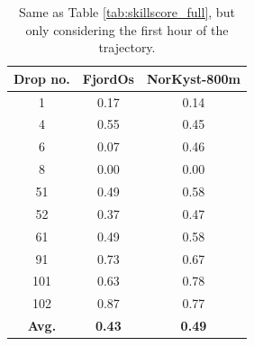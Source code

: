 \begin{table}
\begin{center}
  \begin{tabular}{ | c | c | c |}
    \hline
    {\bf Drop no.} & {\bf FjordOs} & {\bf NorKyst-800m} \\ \hline
    1 & 0.17 & 0.14 \\ 
    4 & 0.55 & 0.45 \\
    6 & 0.07 & 0.46 \\
    8 & 0.00 & 0.00 \\
    51 & 0.49 & 0.58 \\
    52 & 0.37 & 0.47 \\
    61 & 0.49 & 0.58 \\
    91 & 0.73 & 0.67 \\
    101 & 0.63 & 0.78 \\
    102 & 0.87 & 0.77 \\ \hline
    {\bf Avg.} & {\bf 0.43} & {\bf 0.49} \\
    \hline
  \end{tabular}
\caption{Same as Table \ref{tab:skillscore_full}, but only considering the first hour of the trajectory.}
\label{tab:skillscore_1hr}
\end{center}
\end{table}

